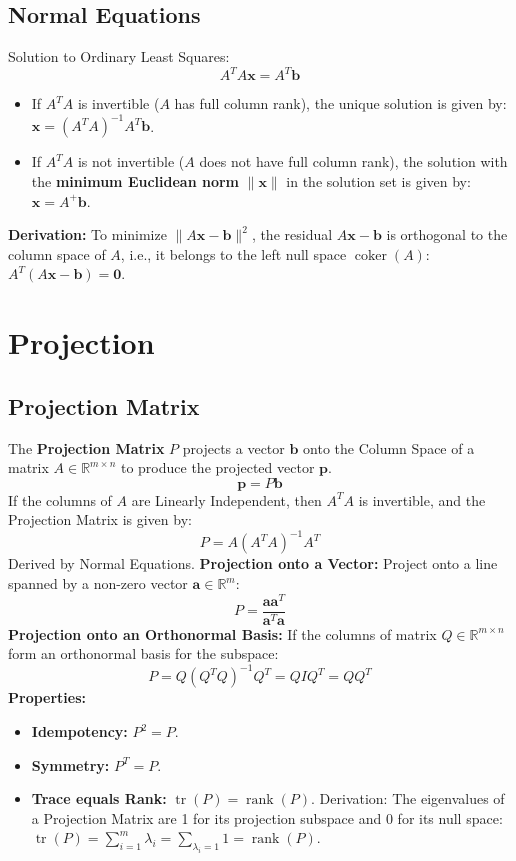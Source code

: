 \documentclass{article}
\begin{document}
\subsection{Normal Equations}
Solution to Ordinary Least Squares:
\[
    A^T A \mathbf{x} = A^T \mathbf{b}
\]
\begin{itemize}
    \item If $A^T A$ is invertible ($A$ has full column rank), the unique solution is given by: $\mathbf{x} = (A^T A)^{-1} A^T \mathbf{b}$.
    \item If $A^T A$ is not invertible ($A$ does not have full column rank), the solution with the \textbf{minimum Euclidean norm} $\|\mathbf{x}\|$ in the solution set is given by: $\mathbf{x} = A^+ \mathbf{b}$.
\end{itemize}
\textbf{Derivation:} To minimize $\|A\mathbf{x} - \mathbf{b}\|^2$, the residual $A\mathbf{x} - \mathbf{b}$ is orthogonal to the column space of $A$, i.e., it belongs to the left null space $\operatorname{coker}(A)$: $A^T(A\mathbf{x} - \mathbf{b}) = \mathbf{0}$.


\newpage
\section{Projection}

\subsection{Projection Matrix}

The \textbf{Projection Matrix} $P$ projects a vector $\mathbf{b}$ onto the Column Space of a matrix $A \in \mathbb{R}^{m \times n}$ to produce the projected vector $\mathbf{p}$.
\[
    \mathbf{p} = P\mathbf{b}
\]
If the columns of $A$ are Linearly Independent, then $A^TA$ is invertible, and the Projection Matrix is given by:
\[
    P = A(A^TA)^{-1}A^T
\]
Derived by Normal Equations.
\newline
\textbf{Projection onto a Vector:}
\newline
Project onto a line spanned by a non-zero vector $\mathbf{a} \in \mathbb{R}^m$:
\[
    P = \frac{\mathbf{a}\mathbf{a}^T}{\mathbf{a}^T\mathbf{a}}
\]
\textbf{Projection onto an Orthonormal Basis:}
\newline
If the columns of matrix $Q \in \mathbb{R}^{m \times n}$ form an orthonormal basis for the subspace:
\[
    P = Q(Q^TQ)^{-1}Q^T = QIQ^T = QQ^T
\]
\textbf{Properties:}
\begin{itemize}
    \item \textbf{Idempotency:} $P^2 = P$.
    \item \textbf{Symmetry:} $P^T = P$.
    \item \textbf{Trace equals Rank:} $\operatorname{tr}(P) = \operatorname{rank}(P)$.
    \newline
    Derivation: The eigenvalues of a Projection Matrix are 1 for its projection subspace and 0 for its null space: $\operatorname{tr}(P) = \sum_{i=1}^m \lambda_i = \sum_{\lambda_i=1} 1 = \operatorname{rank}(P)$.
\end{itemize}
\end{document}
